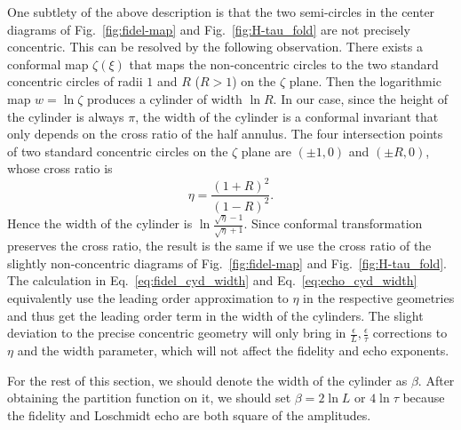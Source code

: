 One subtlety of the above description is that the two semi-circles in the center diagrams of Fig.~\ref{fig:fidel-map} and Fig.~\ref{fig:H-tau_fold} are not precisely concentric. This can be resolved by the following observation. There exists a conformal map $\zeta(\xi)$ that maps the non-concentric circles to the two standard concentric circles of radii $1$ and $R$ ($R>1$) on the $\zeta$ plane\cite{brown_complex_2009}. Then the logarithmic map $w = \ln \zeta$ produces a cylinder of width $\ln R$. In our case, since the height of the cylinder is always $\pi$, the width of the cylinder is a conformal invariant that only depends on the cross ratio of the half annulus. The four intersection points of two standard concentric circles on the $\zeta$ plane are $(\pm 1,0)$ and $(\pm R,0)$, whose cross ratio is
\begin{equation}
\eta = \frac{(1 + R)^2}{(1 - R)^2}. 
\end{equation}
Hence the width of the cylinder is $\ln \frac{\sqrt{ \eta } - 1}{\sqrt{ \eta} + 1}$. Since conformal transformation preserves the cross ratio, the result is the same if we use the cross ratio of the slightly non-concentric diagrams of Fig.~\ref{fig:fidel-map} and Fig.~\ref{fig:H-tau_fold}. The calculation in Eq.~\eqref{eq:fidel_cyd_width} and Eq.~\eqref{eq:echo_cyd_width} equivalently use the leading order approximation to $\eta$ in the respective geometries and thus get the leading order term in the width of the cylinders. The slight deviation to the precise concentric geometry will only bring in $\frac{\epsilon}{L}, \frac{\epsilon}{\tau}$ corrections to $\eta$ and the width parameter, which will not affect the fidelity and echo exponents. 

For the rest of this section, we should denote the width of the cylinder as $\beta$. After obtaining the partition function on it, we should set $\beta = 2 \ln L$ or $ 4 \ln \tau$ because the fidelity and Loschmidt echo are both square of the amplitudes.

